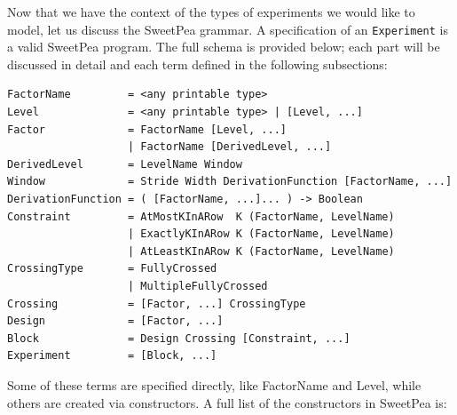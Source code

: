 Now that we have the context of the types of experiments we would like to model, let us discuss the SweetPea grammar. A specification of an \texttt{Experiment} is a valid SweetPea program. The full schema is provided below; each part will be discussed in detail and each term defined in the following subsections:


\begin{verbatim}
FactorName         = <any printable type>
Level              = <any printable type> | [Level, ...]
Factor             = FactorName [Level, ...]
                   | FactorName [DerivedLevel, ...]
DerivedLevel       = LevelName Window
Window             = Stride Width DerivationFunction [FactorName, ...]
DerivationFunction = ( [FactorName, ...]... ) -> Boolean
Constraint         = AtMostKInARow  K (FactorName, LevelName)
                   | ExactlyKInARow K (FactorName, LevelName)
                   | AtLeastKInARow K (FactorName, LevelName)
CrossingType       = FullyCrossed
                   | MultipleFullyCrossed
Crossing           = [Factor, ...] CrossingType
Design             = [Factor, ...]
Block              = Design Crossing [Constraint, ...]
Experiment         = [Block, ...]
\end{verbatim}


Some of these terms are specified directly, like FactorName and Level, while others are created via constructors. A full list of the constructors in SweetPea is:

